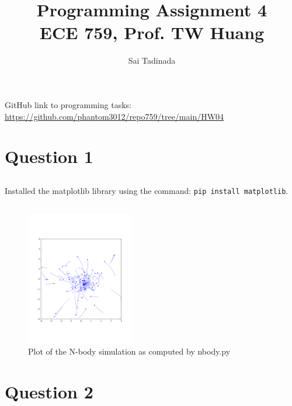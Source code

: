 \documentclass[12pt]{article}
\title{Programming Assignment 4 \\ \small{ECE 759, Prof. TW Huang}}
\author{Sai Tadinada}
\date{}
\begin{document}
\maketitle

GitHub link to programming tasks: \\ \url{https://github.com/phantom3012/repo759/tree/main/HW04}

\section{Question 1}
\subsection{}
Installed the matplotlib library using the command: \texttt{pip install matplotlib}.
\subsection{}
\begin{figure}[ht]
    \centering
    \includegraphics[width=0.4175\textwidth]{task1.png}
    \caption{Plot of the N-body simulation as computed by nbody.py}
\end{figure}
\newpage

\section{Question 2}
\end{document}
